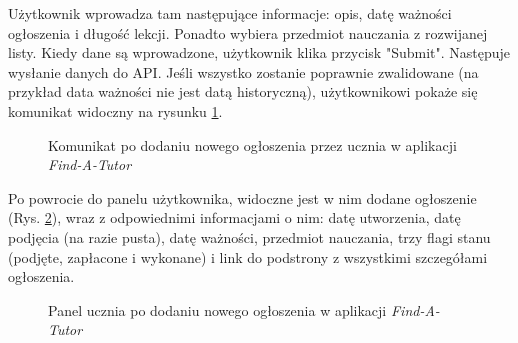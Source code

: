 \documentclass[12pt]{article}
\numberwithin{figure}{section}
\begin{document}
\begin{sloppypar}
Użytkownik wprowadza tam następujące informacje: opis, datę ważności ogłoszenia i długość lekcji. Ponadto wybiera przedmiot nauczania z rozwijanej listy. Kiedy dane są wprowadzone, użytkownik klika przycisk "Submit". Następuje wysłanie danych do API. Jeśli wszystko zostanie poprawnie zwalidowane (na przykład data ważności nie jest datą historyczną), użytkownikowi pokaże się komunikat widoczny na rysunku \ref{fig:added}.
\begin{figure}[!htbp] 
    \centering
    \caption{Komunikat po dodaniu nowego ogłoszenia przez ucznia w aplikacji \textit{Find-A-Tutor}}
    \label{fig:added}
\end{figure}

Po powrocie do panelu użytkownika, widoczne jest w nim dodane ogłoszenie (Rys. \ref{fig:student}), wraz z odpowiednimi informacjami o nim: datę utworzenia, datę podjęcia (na razie pusta), datę ważności, przedmiot nauczania, trzy flagi stanu (podjęte, zapłacone i wykonane) i link do podstrony z wszystkimi szczegółami ogłoszenia.
\begin{figure}[!htbp] 
    \centering
    \caption{Panel ucznia po dodaniu nowego ogłoszenia w aplikacji \textit{Find-A-Tutor}}
    \label{fig:student}
\end{figure}


\end{sloppypar}
\end{document}
